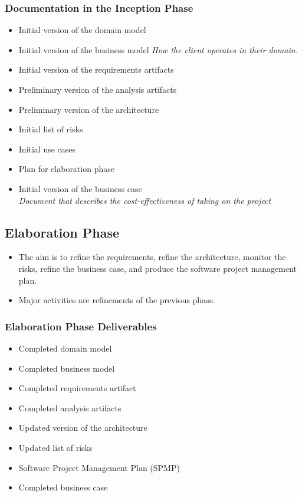 \documentclass{report}
\begin{document}
				\subsubsection{Documentation in the Inception Phase}
					\begin{itemize}
						\item Initial version of the domain model
						\item Initial version of the business model
							\textit{How the client operates in their domain.}
						\item Initial version of the requirements artifacts
						\item Preliminary version of the analysis artifacts
						\item Preliminary version of the architecture
						\item Initial list of risks
						\item Initial use cases
						\item Plan for elaboration phase
						\item Initial version of the business case\\
							\textit{Document that describes the cost-effectiveness of taking on the project}
					\end{itemize}
			\subsection{Elaboration Phase}
				\begin{itemize}
					\item The aim is to refine the requirements, refine the architecture, monitor the risks, refine the business case, and produce the software project management plan.
					\item Major activities are refinements of the previous phase.
				\end{itemize}
				\subsubsection{Elaboration Phase Deliverables}
					\begin{itemize}
						\item Completed domain model
						\item Completed business model
						\item Completed requirements artifact
						\item Completed analysis artifacts
						\item Updated version of the architecture
						\item Updated list of risks
						\item Software Project Management Plan (SPMP)
						\item Completed business case
					\end{itemize}
\end{document}
